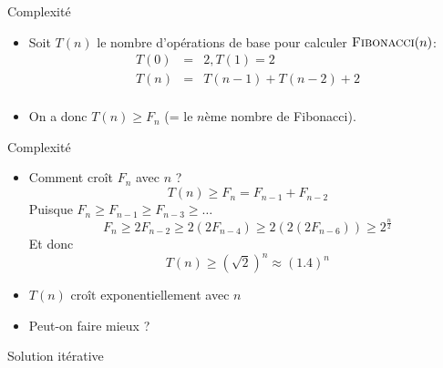 \begin{frame}{Complexité}
\begin{center}
\end{center}

\bigskip

\begin{itemize}
\item Soit $T(n)$ le nombre d'opérations de base pour calculer $\textnormal{\scshape Fibonacci}(n)$:
\begin{eqnarray*}
T(0) & = & 2, T(1)=2\\
T(n) & = & T(n-1)+T(n-2)+2\\
\end{eqnarray*}
\item On a donc $T(n)\geq F_n$ (= le $n$ème nombre de Fibonacci).
\end{itemize}

\end{frame}

\begin{frame}{Complexité}

\begin{itemize}
\item Comment croît $F_n$ avec $n$ ?
$$T(n)\geq F_n=F_{n-1}+F_{n-2}$$
Puisque $F_n\geq F_{n-1}\geq F_{n-3}\geq\ldots$
$$F_n\geq 2 F_{n-2}\geq 2(2 F_{n-4})\geq 2(2(2 F_{n-6})) \geq 2^{\frac{n}{2}}$$
Et donc
$$T(n)\geq (\sqrt{2})^n \approx (1.4)^n$$
\item $T(n)$ croît \alert{exponentiellement} avec $n$

\bigskip

\item Peut-on faire mieux ?
\end{itemize}
\end{frame}

\begin{frame}{Solution itérative}

\begin{center}
\end{center}


\end{frame}

